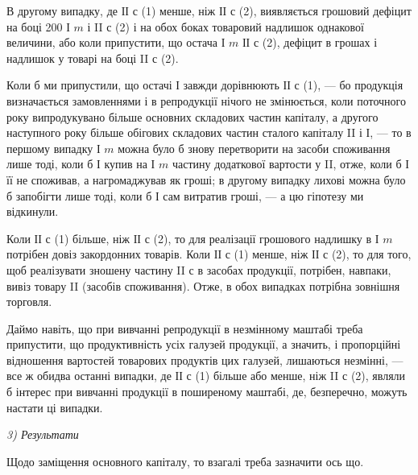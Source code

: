 В другому випадку, де ІІ $с$ (1) менше, ніж ІІ $с$ (2), виявляється грошовий
дефіцит на боці 200 І $m$ і II $с$ (2) і на обох боках товаровий надлишок
однакової величини, або коли припустити, що остача І $m$ \deq{} ІІ $с$ (2), дефіцит
в грошах і надлишок у товарі на боці II $с$ (2).

Коли б ми припустили, що остачі І завжди дорівнюють ІІ $с$ (1), — бо
продукція визначається замовленнями і в репродукції нічого не змінюється,
коли поточного року випродукувано більше основних складових частин
капіталу, а другого наступного року більше обігових складових частин
сталого капіталу II і І, — то в першому випадку І $m$ можна було б знову
перетворити на засоби споживання лише тоді, коли б І купив на І $m$
частину додаткової вартости у II, отже, коли б І її не споживав, а нагромаджував
як гроші; в другому випадку лихові можна було б запобігти
лише тоді, коли б І сам витратив гроші, — а цю гіпотезу ми
відкинули.

Коли ІІ $с$ (1) більше, ніж ІІ $с$ (2), то для реалізації грошового надлишку
в І $m$ потрібен довіз закордонних товарів. Коли ІІ $с$ (1) менше, ніж ІІ $с$
(2), то для того, щоб реалізувати зношену частину II $с$ в засобах продукції,
потрібен, навпаки, вивіз товару II (засобів споживання). Отже, в
обох випадках потрібна зовнішня торговля.

Даймо навіть, що при вивчанні репродукції в незмінному маштабі
треба припустити, що продуктивність усіх галузей продукції, а значить,
і пропорційні відношення вартостей товарових продуктів цих галузей,
лишаються незмінні, — все ж обидва останні випадки, де ІІ $с$ (1) більше
або менше, ніж II $с$ (2), являли б інтерес при вивчанні продукції в поширеному
маштабі, де, безперечно, можуть настати ці випадки.

\emph{3) Результати}  %


Щодо заміщення основного капіталу, то взагалі треба зазначити ось що.

